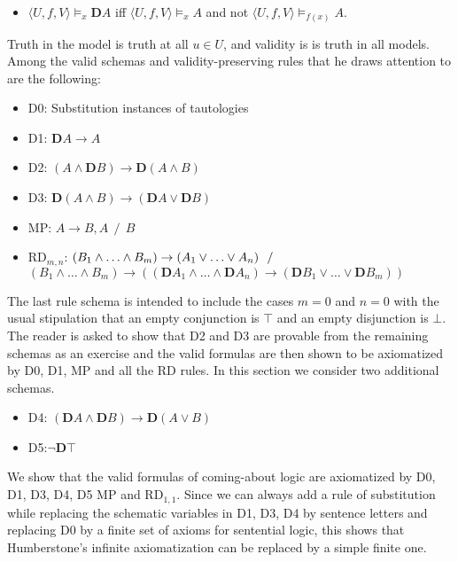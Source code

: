 \documentclass[
  10pt,
  letterpaper,
  DIV=11,
  numbers=noendperiod,
  twoside]{scrartcl}
\providecommand{\tightlist}{%
  \setlength{\itemsep}{0pt}\setlength{\parskip}{0pt}}\usepackage{longtable,booktabs,array}
\begin{document}
\begin{itemize}
\tightlist
\item
  \(\langle U,f,V\rangle \models _x \mathbf{D}A\) iff
  \(\langle U,f,V\!\rangle \models _x A\) and not
  \(\langle U,f,V\!\rangle \models _{f(x)} A\).
\end{itemize}

Truth in the model is truth at all \(u{\in}U\), and validity is is truth
in all models. Among the valid schemas and validity-preserving rules
that he draws attention to are the following:

\begin{itemize}
\tightlist
\item
  D0: Substitution instances of tautologies
\item
  D1: \(\mathbf{D}A\rightarrow A\)
\item
  D2: \((A\wedge\mathbf{D}B) \rightarrow \mathbf{D}(A\wedge B)\)
\item
  D3:
  \(\mathbf{D}(A\wedge B) \rightarrow (\mathbf{D}A\vee \mathbf{D}B)\)
\item
  MP: \(A\rightarrow B, A ~~/~~ B\)
\item
  RD\(_{m,n}\):
  \((B_1 \wedge {\ldots}\wedge B_m) \rightarrow (A_1\vee {\ldots}\vee A_n) ~~/ \\\)\((B_1 \wedge {\ldots}\wedge B_m) \rightarrow ((\mathbf{D}A_1\wedge {\ldots}\wedge \mathbf{D}A_n) \rightarrow (\mathbf{D}B_1 \vee {\ldots}\vee \mathbf{D}B_m))\)
\end{itemize}

The last rule schema is intended to include the cases \(m=0\) and
\(n=0\) with the usual stipulation that an empty conjunction is \(\top\)
and an empty disjunction is \(\bot\). The reader is asked to show that
D2 and D3 are provable from the remaining schemas as an exercise and the
valid formulas are then shown to be axiomatized by D0, D1, MP and all
the RD rules. In this section we consider two additional schemas.

\begin{itemize}
\tightlist
\item
  D4:
  \((\mathbf{D}A\wedge \mathbf{D}B) \rightarrow \mathbf{D}(A\vee B)\)
\item
  D5:\(\neg \mathbf{D}\top\)
\end{itemize}

We show that the valid formulas of coming-about logic are axiomatized by
D0, D1, D3, D4, D5 MP and RD\(_{1,1}\). Since we can always add a rule
of substitution while replacing the schematic variables in D1, D3, D4 by
sentence letters and replacing D0 by a finite set of axioms for
sentential logic, this shows that Humberstone's infinite axiomatization
can be replaced by a simple finite one.
\end{document}
